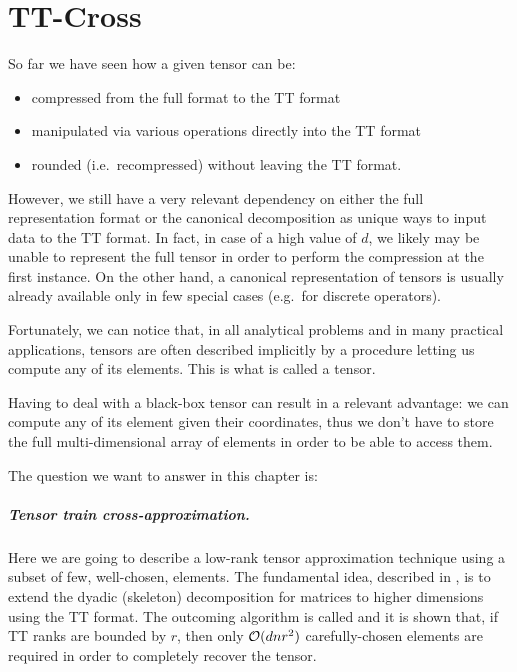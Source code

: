 \chapter{TT-Cross}
So far we have seen how a given tensor can be:
\begin{itemize}
\item compressed from the full format to the TT format
\item manipulated via various operations directly into the TT format
\item rounded (i.e.\ recompressed) without leaving the TT format.
\end{itemize}

However, we still have a very relevant dependency on either the full representation format or the canonical decomposition as unique ways to input data to the TT format.
In fact, in case of a high value of $d$, we likely may be unable to represent the full tensor in order to perform the compression at the first instance. On the other hand, a canonical representation of tensors is usually already available only in few special cases (e.g.\ for discrete operators).

Fortunately, we can notice that, in all analytical problems and in many practical applications, tensors are often described implicitly by a procedure letting us compute any of its elements.
This is what is called a  tensor.

Having to deal with a black-box tensor can result in a relevant advantage: we can compute any of its element given their coordinates, thus we don't have to store the full multi-dimensional array of elements in order to be able to access them.

The question we want to answer in this chapter is: 

\paragraph{Tensor train cross-approximation.}
Here we are going to describe a low-rank tensor approximation technique using a subset of few, well-chosen, elements.
The fundamental idea, described in \cite{tt-cross}, is to extend the dyadic (skeleton) decomposition for matrices to higher dimensions using the TT format.
The outcoming algorithm is called  and it is shown that, if TT ranks are bounded by $r$, then only $\mathcal{O}(dnr^2)$ carefully-chosen elements are required in order to completely recover the tensor.

